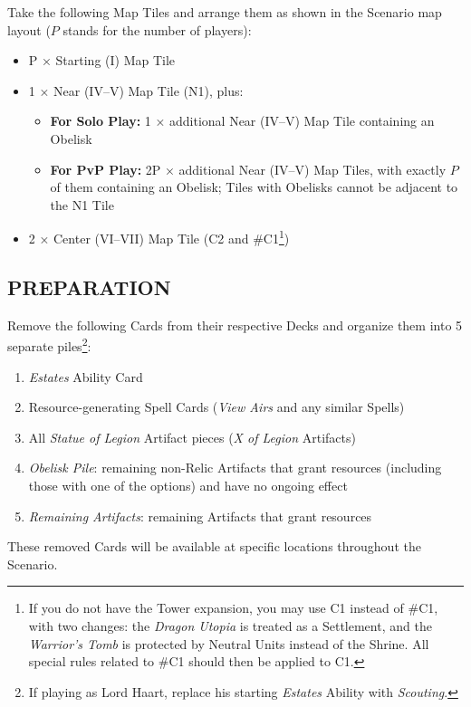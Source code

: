 \begin{multicols}{2}
Take the following Map Tiles and arrange them as shown in the Scenario map layout ($P$ stands for the number of players):
\begin{itemize}
  \item P × Starting (I) Map Tile
  \item 1 × Near (IV--V) Map Tile (N1), plus:
  \begin{itemize}
    \item \textbf{For Solo Play:} 1 × additional Near (IV--V) Map Tile containing an Obelisk
    \item \textbf{For PvP Play:} 2P × additional Near (IV--V) Map Tiles, with exactly $P$ of them containing an Obelisk; Tiles with Obelisks cannot be adjacent to the N1 Tile
  \end{itemize}
  \item 2 × Center (VI--VII) Map Tile (C2 and \#C1\footnote{If you do not have the Tower expansion, you may use C1 instead of \#C1, with two changes: the \textit{Dragon Utopia} is treated as a Settlement, and the \textit{Warrior's Tomb} is protected by Neutral Units instead of the Shrine. All special rules related to \#C1 should then be applied to C1.})
\end{itemize}
\subsection*{\MakeUppercase{Preparation}}

Remove the following Cards from their respective Decks and organize them into 5 separate piles\footnote{If playing as Lord Haart, replace his starting \textit{Estates} Ability with \textit{Scouting}.}:
  
\begin{enumerate}
  \item \textit{Estates} Ability Card
  \item Resource-generating Spell Cards (\textit{View Airs} and any similar Spells)
  \item All \textit{Statue of Legion} Artifact pieces (\textit{X of Legion} Artifacts)
  \item \textit{Obelisk Pile}: remaining non-Relic Artifacts that grant resources (including those with one of the options) and have no ongoing effect
  \item \textit{Remaining Artifacts}: remaining Artifacts that grant resources 
\end{enumerate}
  
These removed Cards will be available at specific locations throughout the Scenario.


\end{multicols}
